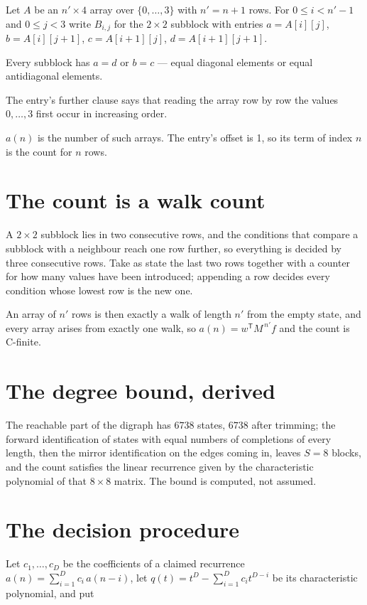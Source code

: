 \documentclass[11pt]{article}
\theoremstyle{definition}
\begin{document}
Let $A$ be an $n' \times 4$ array over $\{0,\dots,3\}$ with $n' = n + 1$ rows. For $0 \le i < n'-1$ and $0 \le j < 3$ write $B_{i,j}$ for the $2\times2$ subblock with entries $a = A[i][j]$, $b = A[i][j{+}1]$, $c = A[i{+}1][j]$, $d = A[i{+}1][j{+}1]$.

Every subblock has $a = d$ or $b = c$ --- equal diagonal elements or equal antidiagonal elements.

The entry's further clause says that reading the array row by row the values $0,\dots,3$ first occur in increasing order.

$a(n)$ is the number of such arrays. The entry's offset is 1, so its term of index $n$ is the count for $n$ rows.

\section{The count is a walk count}

A $2\times2$ subblock lies in two consecutive rows, and the conditions that compare a subblock with a neighbour reach one row further, so everything is decided by three consecutive rows. Take as state the last two rows together with a counter for how many values have been introduced; appending a row decides every condition whose lowest row is the new one.

An array of $n'$ rows is then exactly a walk of length $n'$ from the empty state, and every array arises from exactly one walk, so $a(n) = w^{\mathsf T}M^{\,n'}f$ and the count is C-finite.

\section{The degree bound, derived}

The reachable part of the digraph has $6738$ states, $6738$ after trimming; the forward identification of states with equal numbers of completions of every length, then the mirror identification on the edges coming in, leaves $S = 8$ blocks, and the count satisfies the linear recurrence given by the characteristic polynomial of that $8\times8$ matrix. The bound is computed, not assumed.

\section{The decision procedure}

Let $c_1,\dots,c_D$ be the coefficients of a claimed recurrence $a(n) = \sum_{i=1}^{D} c_i\,a(n-i)$, let $q(t) = t^{D} - \sum_{i=1}^{D} c_i t^{D-i}$ be its characteristic polynomial, and put
\end{document}

